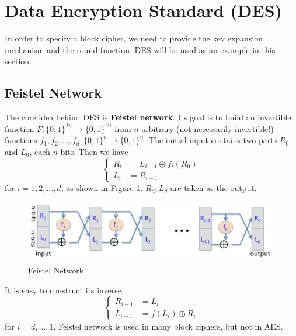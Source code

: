 \section{Data Encryption Standard (DES)}
In order to specify a block cipher, we need to provide the key expansion mechanism and the round function. DES will be used as an example in this section.
\subsection{Feistel Network}
The core idea behind DES is \textbf{Feistel network}. Its goal is to build an invertible function $F:\{0,1\}^{2n}\rightarrow\{0,1\}^{2n}$ from $n$ arbitrary (not necessarily invertible!) functions $f_1,f_2,\dots,f_d:\{0,1\}^n\rightarrow\{0,1\}^n$. The initial input contains two parts $R_0$ and $L_0$, each $n$ bits. Then we have 
\begin{equation*}\begin{cases}
R_i&=L_{i-1}\oplus f_i(R_0)\\
L_i&=R_{i-1}
\end{cases}\end{equation*}
for $i=1,2,\dots,d$, as shown in Figure \ref{feistel}. $R_d,L_d$ are taken as the output. 
\begin{figure}[ht]
\centering
\includegraphics[width=\textwidth]{feistel.jpg}
\caption{Feistel Network}\label{feistel}
\end{figure}

It is easy to construct its inverse:
\begin{equation*}\begin{cases}
R_{i-1}&=L_i\\
L_{i-1}&=f(L_i)\oplus R_i
\end{cases}\end{equation*}
for $i=d,\dots,1$. Feistel network is used in many block ciphers, but not in AES.

